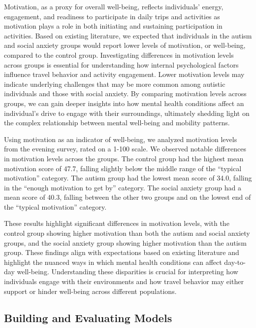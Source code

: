 \documentclass[
  letterpaper,
  number,
  review,
  3p]{elsarticle}
\begin{document}
Motivation, as a proxy for overall well-being, reflects individuals'
energy, engagement, and readiness to participate in daily trips and
activities as motivation plays a role in both initiating and sustaining
participation in activities. Based on existing literature, we expected
that individuals in the autism and social anxiety groups would report
lower levels of motivation, or well-being, compared to the control
group. Investigating differences in motivation levels across groups is
essential for understanding how internal psychological factors influence
travel behavior and activity engagement. Lower motivation levels may
indicate underlying challenges that may be more common among autistic
individuals and those with social anxiety. By comparing motivation
levels across groups, we can gain deeper insights into how mental health
conditions affect an individual's drive to engage with their
surroundings, ultimately shedding light on the complex relationship
between mental well-being and mobility patterns.

Using motivation as an indicator of well-being, we analyzed motivation
levels from the evening survey, rated on a 1-100 scale. We observed
notable differences in motivation levels across the groups. The control
group had the highest mean motivation score of 47.7, falling slightly
below the middle range of the ``typical motivation'' category. The
autism group had the lowest mean score of 34.0, falling in the ``enough
motivation to get by'' category. The social anxiety group had a mean
score of 40.3, falling between the other two groups and on the lowest
end of the ``typical motivation'' category.

These results highlight significant differences in motivation levels,
with the control group showing higher motivation than both the autism
and social anxiety groups, and the social anxiety group showing higher
motivation than the autism group. These findings align with expectations
based on existing literature and highlight the nuanced ways in which
mental health conditions can affect day-to-day well-being. Understanding
these disparities is crucial for interpreting how individuals engage
with their environments and how travel behavior may either support or
hinder well-being across different populations.

\subsection{Building and Evaluating
Models}\label{building-and-evaluating-models}
\end{document}

